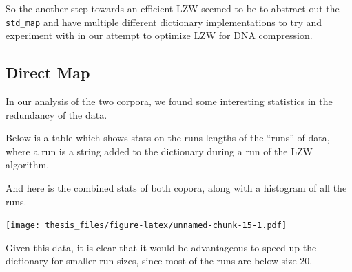 \documentclass[12pt,twoside]{reedthesis}
\begin{document}
So the another step towards an efficient LZW seemed to be to abstract out the \texttt{std\_map} and have multiple different dictionary implementations to try and experiment with in our attempt to optimize LZW for DNA compression.

\hypertarget{direct-map}{%
\subsection{Direct Map}\label{direct-map}}

In our analysis of the two corpora, we found some interesting statistics in the redundancy of the data.

Below is a table which shows stats on the runs lengths of the ``runs'' of data, where a run is a string added to the dictionary during a run of the LZW algorithm.
\begin{table}[H]
\centering
{}
\end{table}
\begin{table}[H]
\centering
{}
\end{table}
And here is the combined stats of both copora, along with a histogram of all the runs.
\begin{table}[H]
\centering
{}
\end{table}
\texttt{[image: thesis\_files/figure-latex/unnamed-chunk-15-1.pdf]}

Given this data, it is clear that it would be advantageous to speed up the dictionary for smaller run sizes, since most of the runs are below size 20.
\end{document}
